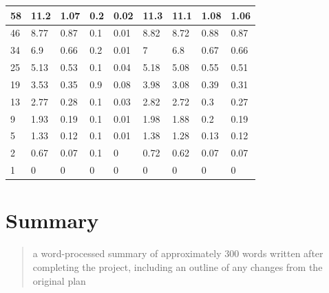 \documentclass{article}
\begin{document}
\begin{table}[!ht]
\begin{tabular}{|l|l|l|l|l|l|l|l|l|}
58                   & 11.2                     & 1.07                    & 0.2                      & 0.02                    & 11.3                     & 11.1                     & 1.08                    & 1.06                    \\ \hline
46                   & 8.77                     & 0.87                    & 0.1                      & 0.01                    & 8.82                     & 8.72                     & 0.88                    & 0.87                    \\ \hline
34                   & 6.9                      & 0.66                    & 0.2                      & 0.01                    & 7                        & 6.8                      & 0.67                    & 0.66                    \\ \hline
25                   & 5.13                     & 0.53                    & 0.1                      & 0.04                    & 5.18                     & 5.08                     & 0.55                    & 0.51                    \\ \hline
19                   & 3.53                     & 0.35                    & 0.9                      & 0.08                    & 3.98                     & 3.08                     & 0.39                    & 0.31                    \\ \hline
13                   & 2.77                     & 0.28                    & 0.1                      & 0.03                    & 2.82                     & 2.72                     & 0.3                     & 0.27                    \\ \hline
9                    & 1.93                     & 0.19                    & 0.1                      & 0.01                    & 1.98                     & 1.88                     & 0.2                     & 0.19                    \\ \hline
5                    & 1.33                     & 0.12                    & 0.1                      & 0.01                    & 1.38                     & 1.28                     & 0.13                    & 0.12                    \\ \hline
2                    & 0.67                     & 0.07                    & 0.1                      & 0                       & 0.72                     & 0.62                     & 0.07                    & 0.07                    \\ \hline
1                    & 0                        & 0                       & 0                        & 0                       & 0                        & 0                        & 0                       & 0                       \\ \hline
\end{tabular}
\end{table}

\section{Summary}
\begin{quote}
  a word-processed summary of approximately 300 words written after completing the project, including an outline of any changes from the original plan
\end{quote}
\end{document}
